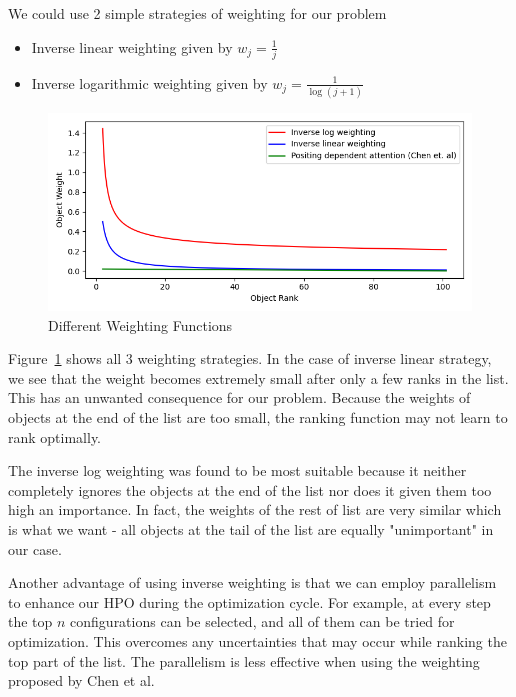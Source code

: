 \documentclass[12pt, twoside, ngerman]{report}
\begin{document}
We could use 2 simple strategies of weighting for our problem
\begin{itemize}
\item Inverse linear weighting given by $w_j = \frac{1}{j}$
\item Inverse logarithmic weighting given by $w_j = \frac{1}{\log (j+1)}$
\end{itemize}

\begin{figure}[htb]
  \centering
    \includegraphics[scale=0.65]{images/weightingfunctions}
    \caption{Different Weighting Functions}
    \label{fig:weightingfunctions}
\end{figure}

Figure~\ref{fig:weightingfunctions} shows all 3 weighting strategies.
In the case of inverse linear strategy,  we see that the weight becomes extremely small after only a few ranks in the list.
This has an unwanted consequence for our problem.
Because the weights of objects at the end of the list are too small,  the ranking function may not learn to rank optimally.

The inverse log weighting was found to be most suitable because it neither completely ignores the objects at the end of the list nor does it given them too high an importance.
In fact,  the weights of the rest of list are very similar which is what we want - all objects at the tail of the list are equally "unimportant" in our case.

Another advantage of using inverse weighting is that we can employ parallelism to enhance our HPO during the optimization cycle.
For example,  at every step the top $n$ configurations can be selected,  and all of them can be tried for optimization.
This overcomes any uncertainties that may occur while ranking the top part of the list. 
The parallelism is less effective when using the weighting proposed by Chen et al.

    
\end{document}
